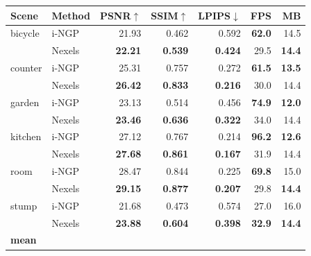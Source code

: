 \begin{table}[t]
\begin{minipage}[t]{0.48\textwidth}
\centering\footnotesize
{}
\label{tab:cross_offline}
\setlength{\tabcolsep}{3pt}
\begin{tabular}{llrrrrr}
\toprule
Scene & Method & PSNR$\uparrow$ & SSIM$\uparrow$ & LPIPS$\downarrow$ & FPS & MB \\
\midrule
bicycle & i-NGP  & 21.93          & 0.462          & 0.592          & \textbf{62.0} & 14.5          \\
        & Nexels & \textbf{22.21} & \textbf{0.539} & \textbf{0.424} & 29.5          & \textbf{14.4} \\
counter & i-NGP  & 25.31          & 0.757          & 0.272          & \textbf{61.5} & \textbf{13.5} \\
        & Nexels & \textbf{26.42} & \textbf{0.833} & \textbf{0.216} & 30.0          & 14.4          \\
garden  & i-NGP  & 23.13          & 0.514          & 0.456          & \textbf{74.9} & \textbf{12.0} \\
        & Nexels & \textbf{23.46} & \textbf{0.636} & \textbf{0.322} & 34.0          & 14.4          \\
kitchen & i-NGP  & 27.12          & 0.767          & 0.214          & \textbf{96.2} & \textbf{12.6} \\
        & Nexels & \textbf{27.68} & \textbf{0.861} & \textbf{0.167} & 31.9          & 14.4          \\
room    & i-NGP  & 28.47          & 0.844          & 0.225          & \textbf{69.8} & 15.0          \\
        & Nexels & \textbf{29.15} & \textbf{0.877} & \textbf{0.207} & 29.8          & \textbf{14.4} \\
stump   & i-NGP  & 21.68          & 0.473          & 0.574          & 27.0          & 16.0          \\
        & Nexels & \textbf{23.88} & \textbf{0.604} & \textbf{0.398} & \textbf{32.9} & \textbf{14.4} \\
\midrule
\multirow{2}{*}{\textbf{mean}}

\end{tabular}
\end{minipage}
\end{table}
